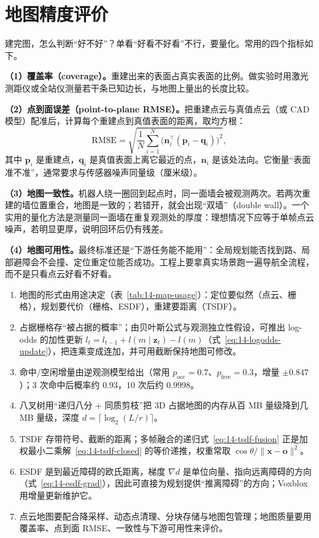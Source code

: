 \section{地图精度评价}\label{sec:14-eval}

建完图，怎么判断``好不好''？单看``好看不好看''不行，要量化。常用的四个指标如下。

\textbf{（1）覆盖率（coverage）。}重建出来的表面占真实表面的比例。做实验时用激光测距仪或全站仪测量若干条已知边长，与地图上量出的长度比较。

\textbf{（2）点到面误差（point-to-plane RMSE）。}把重建点云与真值点云（或 CAD 模型）配准后，计算每个重建点到真值表面的距离，取均方根：
\begin{equation}
\mathrm{RMSE}=\sqrt{\frac{1}{N}\sum_{i=1}^{N}\big(\bm{n}_i^{\top}(\bm{p}_i-\bm{q}_i)\big)^{2}},
\end{equation}
其中 $\bm{p}_i$ 是重建点，$\bm{q}_i$ 是真值表面上离它最近的点，$\bm{n}_i$ 是该处法向。它衡量``表面准不准''，通常要求与传感器噪声同量级（厘米级）。

\textbf{（3）地图一致性。}机器人绕一圈回到起点时，同一面墙会被观测两次。若两次重建的墙位置重合，地图是一致的；若错开，就会出现``双墙''（double wall）。一个实用的量化方法是测量同一面墙在重复观测处的厚度：理想情况下应等于单帧点云噪声，若明显更厚，说明回环后仍有残差。

\textbf{（4）地图可用性。}最终标准还是``下游任务能不能用''：全局规划能否找到路、局部避障会不会撞、定位重定位能否成功。工程上要拿真实场景跑一遍导航全流程，而不是只看点云好看不好看。

\begin{summary}
\begin{enumerate}
  \item 地图的形式由用途决定（表~\ref{tab:14-map-usage}）：定位要似然（点云、栅格），规划要代价（栅格、ESDF），重建要距离（TSDF）。
  \item 占据栅格存``被占据的概率''；由贝叶斯公式与观测独立性假设，可推出 log-odds 的加性更新 $l_t=l_{t-1}+l(m\mid\bm{z}_t)-l(m)$（式~\eqref{eq:14-logodds-update}），把连乘变成连加，并可用截断保持地图可修改。
  \item 命中/空闲增量由逆观测模型给出（常用 $p_{\mathrm{occ}}=0.7$、$p_{\mathrm{free}}=0.3$，增量 $\pm0.847$）；3 次命中后概率约 $0.93$，10 次后约 $0.9998$。
  \item 八叉树用``递归八分 + 同质剪枝''把 3D 占据地图的内存从百 MB 量级降到几 MB 量级，深度 $d=\lceil\log_2(L/r)\rceil$。
  \item TSDF 存带符号、截断的距离；多帧融合的递归式~\eqref{eq:14-tsdf-fusion} 正是加权最小二乘解~\eqref{eq:14-tsdf-closed} 的等价递推，权重常取 $\cos\theta/\|\bm{x}-\bm{o}\|^{2}$。
  \item ESDF 是到最近障碍的欧氏距离，梯度 $\nabla d$ 是单位向量、指向远离障碍的方向（式~\eqref{eq:14-esdf-grad}），因此可直接为规划提供``推离障碍''的方向；Voxblox 用增量更新维护它。
  \item 点云地图要配合降采样、动态点清理、分块存储与地图包管理；地图质量要用覆盖率、点到面 RMSE、一致性与下游可用性来评价。
\end{enumerate}


\end{summary}

